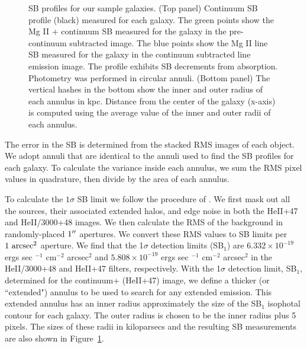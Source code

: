 \documentclass[twocolumn]{aastex61}
\begin{document}
\begin{figure}
\centering
{}
\caption{SB profiles for our sample galaxies. (Top panel) Continuum SB profile (black) measured for each galaxy. The green points show the Mg II + continuum SB measured for the galaxy in the pre-continuum subtracted image. The blue points show the Mg II line SB measured for the galaxy in the continuum subtracted line emission image.  The profile exhibits SB decrements from  absorption. Photometry was performed in circular annuli. (Bottom panel) The vertical hashes in the bottom show the inner and outer radius of each annulus in kpc. Distance from the center of the galaxy (x-axis) is computed using the average value of the inner and outer radii of each annulus.}
\label{fig:sb_profiles}
\end{figure}

The error in the SB is determined from the stacked RMS images of each object.  We adopt annuli that are identical to the annuli used to find the SB profiles for each galaxy. To calculate the variance inside each annulus, we sum the RMS pixel values in quadrature, then divide by the area of each annulus. 

To calculate the $1\sigma$ SB limit we follow the procedure of \cite{Battaia_2015}. We first mask out all the sources, their associated extended halos, and edge noise in both the HeII+47 and HeII/3000+48 images. We then calculate the RMS of the background in randomly-placed $1\mbox{$^{\prime\prime}$}$ apertures. We convert these RMS values to SB limits per $1~\rm arcsec^2$  aperture. We find that the 1$\sigma$ detection limits %
(SB$_1$) are $6.332\times10^{-19}$ ergs sec $^{-1}$ cm$^{-2}$ arcsec$^2$ and $5.808\times10^{-19} $ ergs sec $^{-1}$ cm$^{-2}$ arcsec$^2$ in the HeII/3000+48 and HeII+47 filters, respectively. With the 1$\sigma$ detection limit, SB$_1$, determined for the continuum+ (HeII+47) image, we define a thicker (or ``extended") annulus to be used to search for any extended  emission. This extended annulus has an inner radius approximately the size of the SB$_1$ isophotal contour for each galaxy. The outer radius is chosen to be the inner radius plus 5 pixels.  The sizes of these radii in kiloparsecs and the resulting SB measurements are also shown in Figure~\ref{fig:sb_profiles}.
\end{document}
